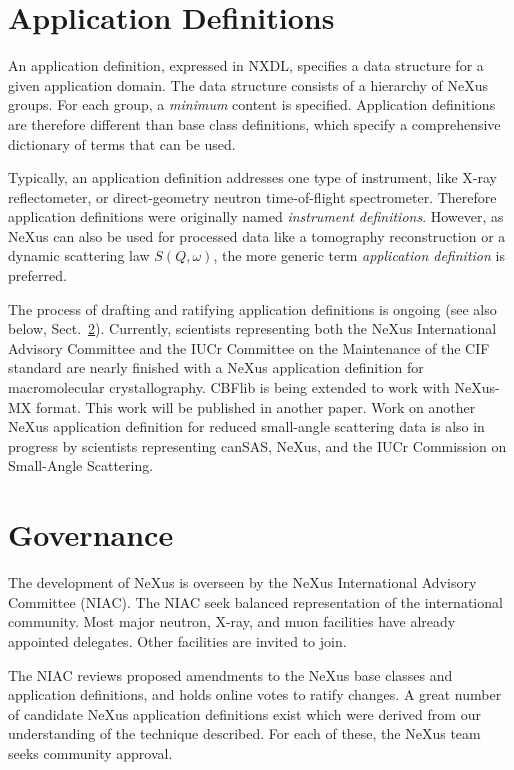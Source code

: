\documentclass[%
 aip,
rsi,
 amsmath,amssymb,
 reprint,%
]{revtex4-1}
\begin{document}
\section{Application Definitions}
  \label{sect_appdef}

An application definition, expressed in NXDL, specifies a data structure
for a given application domain.
The data structure consists of a hierarchy of NeXus groups.
For each group, a \emph{minimum} content is specified.
Application definitions are therefore different than
base class definitions, which specify a comprehensive 
dictionary of terms that can be used.

Typically, an application definition addresses one type of instrument,
like X-ray reflectometer,
or direct-geometry neutron time-of-flight spectrometer.
Therefore application definitions were originally named \emph{instrument definitions}.
However, as NeXus can also be used for processed data
like a tomography reconstruction or a dynamic scattering law $S(Q,\omega)$, 
the more generic term \emph{application definition} is preferred.

The process of drafting and ratifying application definitions
is ongoing (see also below, Sect.~\ref{sect_gov}).
Currently, scientists representing both
the NeXus International Advisory Committee and the IUCr Committee on the Maintenance
of the CIF standard 
are nearly finished with a NeXus application definition for macromolecular crystallography.
CBFlib\cite{cbflib} is being extended to work with NeXus-MX format. This work will be published in another paper. 
Work on another NeXus application definition for reduced small-angle scattering data
is also in progress\cite{cansas}  by scientists representing
canSAS, NeXus, and the IUCr Commission on Small-Angle Scattering.


\section{Governance}
  \label{sect_gov}

The development of NeXus is overseen
by the NeXus International Advisory Committee (NIAC)\cite{niac}.
The NIAC seek balanced representation of the international community.
Most major neutron, X-ray, and muon facilities have already appointed delegates.
Other facilities are invited to join.

The NIAC reviews proposed amendments to the NeXus base classes and
application definitions, and holds online votes to ratify changes.
A great number of candidate NeXus application definitions exist which were derived from our understanding of the technique described.
For each of these, the NeXus team seeks community approval. 
\end{document}
